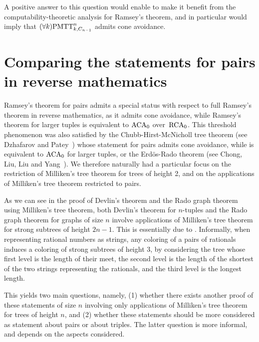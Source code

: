 A positive answer to this question would enable to make it benefit from the computability-theoretic analysis for Ramsey's theorem, and in particular would imply that $(\forall k)\mathrm{PMTT}^{n}_{k,C_{n-1}}$ admits cone avoidance.

\section{Comparing the statements for pairs in reverse mathematics}

Ramsey's theorem for pairs admits a special status with respect to full Ramsey's theorem in reverse mathematics, as it admits cone avoidance, while Ramsey's theorem for larger tuples is equivalent to $\mathrm{ACA}_0$ over~$\mathrm{RCA}_0$. This threshold phenomenon was also satisfied by the Chubb-Hirst-McNicholl tree theorem (see Dzhafarov and Patey~\cite{Dzhafarov2017Coloring}) whose statement for pairs admits cone avoidance, while is equivalent to $\mathrm{ACA}_0$ for larger tuples, or the Erd\"os-Rado theorem (see Chong, Liu, Liu and Yang~\cite{Chong2019Strengthc}).
We therefore naturally had a particular focus on the restriction of Milliken's tree theorem for trees of height 2, and on the applications of Milliken's tree theorem restricted to pairs.

As we can see in the proof of Devlin's theorem and the Rado graph theorem using Milliken's tree theorem, both Devlin's theorem for $n$-tuples and the Rado graph theorem for graphs of size $n$ involve applications of Milliken's tree theorem for strong subtrees of height $2n-1$. This is essentially due to . Informally, when representing rational numbers as strings, any coloring of a pairs of rationals induces a coloring of strong subtrees of height 3, by considering the tree whose first level is the length of their meet, the second level is the length of the shortest of the two strings representing the rationals, and the third level is the longest length. 

This yields two main questions, namely, (1) whether there exists another proof of these statements of size $n$ involving only applications of Milliken's tree theorem for trees of height $n$, and (2) whether these statements should be more considered as statement about pairs or about triples. The latter question is more informal, and depends on the aspects considered. 

